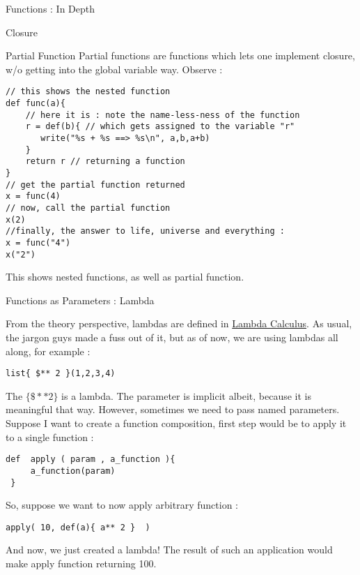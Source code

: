 \begin{section}{Functions : In Depth}
\begin{subsection}{Closure}
\end{subsection}

\begin{subsection}{Partial Function}
Partial functions are functions which lets one implement closure, w/o 
getting into the global variable way. Observe :

\begin{lstlisting}[style=JexlStyle]
// this shows the nested function 
def func(a){
    // here it is : note the name-less-ness of the function
    r = def(b){ // which gets assigned to the variable "r"
       write("%s + %s ==> %s\n", a,b,a+b)
    }
    return r // returning a function 
}
// get the partial function returned 
x = func(4)
// now, call the partial function 
x(2)
//finally, the answer to life, universe and everything :
x = func("4")
x("2")
\end{lstlisting}
This shows nested functions, as well as partial function.
\end{subsection}

\begin{subsection}{Functions as Parameters : Lambda}

From the theory perspective, lambdas are defined in \href{https://en.wikipedia.org/wiki/Lambda_calculus}{Lambda Calculus}. 
As usual, the jargon guys made a fuss out of it, but as of now, we are using lambdas all along, for example :

\begin{lstlisting}[style=JexlStyle]
list{ $** 2 }(1,2,3,4)
\end{lstlisting}
 
The $\{ \$ ** 2 \}$ is a lambda. The parameter is implicit albeit, because it is meaningful that way. However, sometimes we need to pass named parameters. Suppose I want to create a function composition, first step would be to apply it to a single function :

\begin{lstlisting}[style=JexlStyle]
 def  apply ( param , a_function ){
     a_function(param)
 }
\end{lstlisting} 
So, suppose we want to now apply arbitrary function :
\begin{lstlisting}[style=JexlStyle]
 apply( 10, def(a){ a** 2 }  )
\end{lstlisting}
And now, we just created a lambda! The result of such an application would make apply function returning 100.
\end{subsection}



\end{section}
